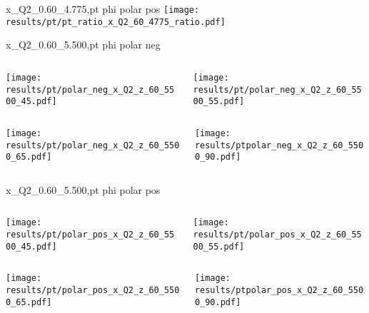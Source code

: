 \begin{frame}{x\_Q2\_0.60\_4.775,pt phi polar pos}
\texttt{[image: results/pt/pt\_ratio\_x\_Q2\_60\_4775\_ratio.pdf]}
\end{frame}
\begin{frame}{x\_Q2\_0.60\_5.500,pt phi polar neg}
\begin{columns}
\begin{column}[T]{0.5\textwidth}
\texttt{[image: results/pt/polar\_neg\_x\_Q2\_z\_60\_5500\_45.pdf]}
\end{column}
\begin{column}[T]{0.5\textwidth}
\texttt{[image: results/pt/polar\_neg\_x\_Q2\_z\_60\_5500\_55.pdf]}
\end{column}
\end{columns}
\begin{columns}
\begin{column}[T]{0.5\textwidth}
\texttt{[image: results/pt/polar\_neg\_x\_Q2\_z\_60\_5500\_65.pdf]}
\end{column}
\begin{column}[T]{0.5\textwidth}
\texttt{[image: results/ptpolar\_neg\_x\_Q2\_z\_60\_5500\_90.pdf]}
\end{column}
\end{columns}
\end{frame}
\begin{frame}{x\_Q2\_0.60\_5.500,pt phi polar pos}
\begin{columns}
\begin{column}[T]{0.5\textwidth}
\texttt{[image: results/pt/polar\_pos\_x\_Q2\_z\_60\_5500\_45.pdf]}
\end{column}
\begin{column}[T]{0.5\textwidth}
\texttt{[image: results/pt/polar\_pos\_x\_Q2\_z\_60\_5500\_55.pdf]}
\end{column}
\end{columns}
\begin{columns}
\begin{column}[T]{0.5\textwidth}
\texttt{[image: results/pt/polar\_pos\_x\_Q2\_z\_60\_5500\_65.pdf]}
\end{column}
\begin{column}[T]{0.5\textwidth}
\texttt{[image: results/ptpolar\_pos\_x\_Q2\_z\_60\_5500\_90.pdf]}
\end{column}
\end{columns}
\end{frame}
